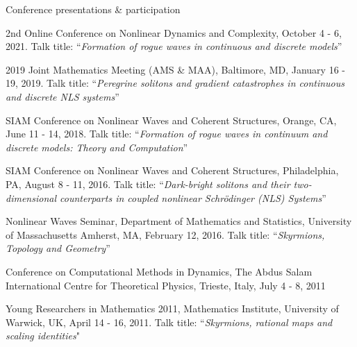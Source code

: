 \documentclass[10pt]{article} %
\begin{document}
\begin{section}{Conference presentations \& participation}
\begin{etaremune}
\setlength\itemsep{1em}


\item \vskip -6.2mm  2nd Online Conference on Nonlinear Dynamics and Complexity, October 4 - 6, 2021.
Talk title: ``\textit{Formation of rogue waves in continuous and discrete models}''
                         
\item
2019 Joint Mathematics Meeting (AMS \& MAA), Baltimore, MD, January 16 - 19, 2019.  
                         Talk title: ``\textit{Peregrine solitons and gradient catastrophes in continuous
                         and discrete NLS systems}''

\item SIAM Conference on Nonlinear Waves and Coherent Structures, Orange, CA, June 11 - 14, 2018.
      Talk title: ``\textit{Formation of rogue waves in continuum and discrete models: Theory and
      Computation}''

\item  SIAM Conference on Nonlinear Waves and Coherent Structures, Philadelphia, PA, August 8 - 11, 2016.
       Talk title: ``\textit{Dark-bright solitons and their two-dimensional counterparts in coupled nonlinear 
       Schr\"odinger (NLS) Systems}''

\item Nonlinear Waves Seminar, Department of Mathematics and Statistics, University of Massachusetts Amherst, 
      MA, February 12, 2016.
      Talk title: ``\textit{Skyrmions, Topology and Geometry}''

\item  Conference on Computational Methods in Dynamics, The Abdus Salam International Centre for
       Theoretical Physics, Trieste, Italy, July 4 - 8, 2011

\item  Young Researchers in Mathematics 2011, Mathematics Institute, University of Warwick, UK, April 14 - 16, 2011.
       Talk title: ``\textit{Skyrmions, rational maps and scaling identities}"
 

\end{etaremune}
\end{section}
\end{document}
